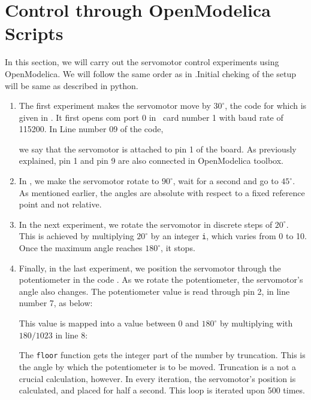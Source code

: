 

\section{Control through OpenModelica Scripts}
\label{sec:servo-OpenModelica}
In this section, we will carry out the servomotor control experiments
using OpenModelica.  We will follow the same order as in
.Initial cheking of the setup will be same as
described in python.

\begin{enumerate}
\item The first experiment makes the servomotor move by $30^\circ$,
  the code for which is given in .
  It first opens com port 0 in \arduino\ card number 1 with baud rate
  of 115200.  In Line number 09 of the code, \ie\
  
  we say that the servomotor is attached to pin 1 of the board.
  As previously explained, pin 1 and pin 9 are also connected in OpenModelica
  toolbox.

\item In , we make the servomotor rotate
  to $90^\circ$, wait for a second and go to $45^\circ$.  As mentioned
  earlier, the angles are absolute with respect to a fixed reference
  point and not relative.  

\item In the next experiment, we rotate the servomotor in discrete
  steps of $20^\circ$.  This is achieved by multiplying $20^\circ$ by
  an integer {\tt i}, which varies from 0 to 10.  Once the maximum
  angle reaches $180^\circ$, it stops.  

\item Finally, in the last experiment, we position the servomotor
  through the potentiometer in the code .  As we
  rotate the potentiometer, the servomotor's angle also changes.  The
  potentiometer value is read through pin 2, in line number 7, as
  below:
  
  This value is mapped into a value between 0 and $180^\circ$ by
  multiplying with $180/1023$ in line 8:
  
  The {\tt floor} function gets the integer part of the number by
  truncation.  This is the angle by which the potentiometer is to be
  moved.  Truncation is a not a crucial calculation, however.  In
  every iteration, the servomotor's position is calculated, and placed
  for half a second.  This loop is iterated upon 500 times.

  \end{enumerate}



